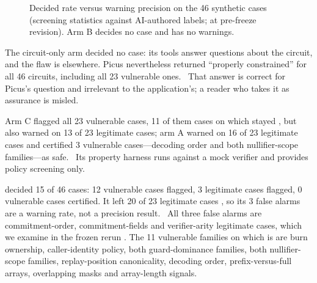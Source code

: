 \begin{figure}[t]
\centering

\caption{Decided rate versus warning precision on the 46 synthetic cases
(screening statistics against AI-authored labels; \tool{} at pre-freeze
revision). Arm B decides no case and has no warnings.}
\label{fig:scatter}
\end{figure}

 The circuit-only arm decided no
case: its tools answer questions about the circuit, and the flaw is
elsewhere. Picus nevertheless returned ``properly constrained'' for all 46
circuits, including all 23 vulnerable ones.%
\
That answer is correct for Picus's question and irrelevant to the
application's; a reader who takes it as assurance is misled.

 Arm C flagged all 23
vulnerable cases, 11 of them cases on which \tool{} stayed \UNK{}, but also
warned on 13 of 23 legitimate cases; arm A warned on 16 of 23 legitimate
cases and certified 3 vulnerable cases---decoding order and both
nullifier-scope families---as safe.%
\
Its property harness runs against a mock verifier and provides policy
screening only.

 \tool{} decided 15 of 46 cases:
12 vulnerable cases flagged, 3 legitimate cases flagged, 0 vulnerable cases
certified. It left 20 of 23 legitimate cases \UNK{}, so its 3 false alarms are
a warning rate, not a precision result.%
\
All three false alarms are commitment-order, commitment-fields and
verifier-arity legitimate cases, which we examine in the frozen rerun
.
The 11 vulnerable families on which \tool{} is \UNK{} are burn ownership,
caller-identity policy, both guard-dominance families, both nullifier-scope
families, replay-position canonicality, decoding order, prefix-versus-full
arrays, overlapping masks and array-length signals.

